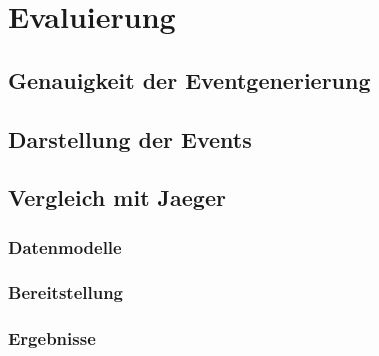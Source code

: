 %

\chapter{Evaluierung}
\section{Genauigkeit der Eventgenerierung}
\section{Darstellung der Events}
\section{Vergleich mit Jaeger}
\subsection{Datenmodelle}
\subsection{Bereitstellung}
\subsection{Ergebnisse}
